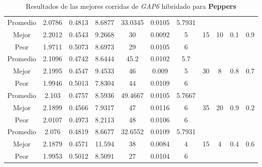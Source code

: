 \begin{table}[h!]
\begin{center}
\begin{tabular}{|c|c|c|c|c|c|c|c|c|c|c|}
        \hline
        \hline
            Promedio  & 2.0786 & 0.4813 & 8.6877 & 33.0345 & 0.0105 & 5.7931 &  &  &  & \\
            \cline{1-7}
            Mejor & 2.2012 & 0.4543  & 9.2668 & 30 & 0.0092 & 5 & 15 & 10 & 0.1 & 0.9\\
            \cline{1-7}
            Peor & 1.9711 & 0.5073  & 8.6973 & 29 & 0.0105 & 6 &  &  &  & \\
        \hline
        \hline
            Promedio  & 2.1096 & 0.4742 & 8.6444 & 45.2 & 0.0102 & 5.7 &  &  &  & \\
            \cline{1-7}
            Mejor & 2.1995 & 0.4547  & 9.4533 & 46 & 0.009 & 5 & 30 & 8 & 0.8 & 0.7\\
            \cline{1-7}
            Peor & 1.9946 & 0.5013  & 7.8304 & 44 & 0.0109 & 6 &  &  &  & \\
        \hline
        \hline
            Promedio  & 2.103 & 0.4757 & 8.5936 & 49.4667 & 0.0105 & 5.7667 &  &  &  & \\
            \cline{1-7}
            Mejor & 2.1899 & 0.4566  & 7.9317 & 47 & 0.0116 & 6 & 35 & 20 & 0.9 & 0.2\\
            \cline{1-7}
            Peor & 2.0107 & 0.4973  & 8.2113 & 48 & 0.0106 & 6 &  &  &  & \\
        \hline
        \hline
            Promedio  & 2.076 & 0.4819 & 8.6677 & 32.6552 & 0.0109 & 5.7931 &  &  &  & \\
            \cline{1-7}
            Mejor & 2.1879 & 0.4571  & 11.594 & 38 & 0.0084 & 4 & 15 & 4 & 0.4 & 0.6\\
            \cline{1-7}
            Peor & 1.9953 & 0.5012  & 8.5091 & 27 & 0.0104 & 6 &  &  &  & \\
        \hline
        \end{tabular}
        \caption{Resultados de las mejores corridas de \emph{GAP6} hibridado para {\bf Peppers}}
        \label{tb:tableGAP6}
    \end{center}
\end{table}
